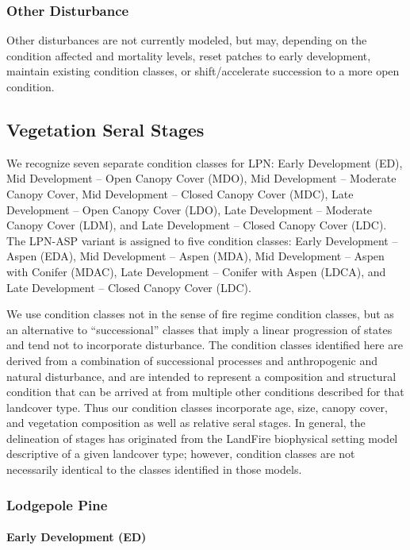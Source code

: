 \subsubsection{Other Disturbance}
Other disturbances are not currently modeled, but may, depending on the condition affected and mortality levels, reset patches to early development, maintain existing condition classes, or shift/accelerate succession to a more open condition. 

\subsection*{Vegetation Seral Stages}
We recognize seven separate condition classes for LPN: Early Development (ED), Mid Development – Open Canopy Cover (MDO), Mid Development – Moderate Canopy Cover, Mid Development – Closed Canopy Cover (MDC), Late Development – Open Canopy Cover (LDO), Late Development – Moderate Canopy Cover (LDM), and Late Development – Closed Canopy Cover (LDC). The LPN-ASP variant is assigned to five condition classes: Early Development – Aspen (EDA), Mid Development – Aspen (MDA), Mid Development – Aspen with Conifer (MDAC), Late Development – Conifer with Aspen (LDCA), and Late Development – Closed Canopy Cover (LDC).

We use condition classes not in the sense of fire regime condition classes, but as an alternative to ``successional'' classes that imply a linear progression of states and tend not to incorporate disturbance. The condition classes identified here are derived from a combination of successional processes and anthropogenic and natural disturbance, and are intended to represent a composition and structural condition that can be arrived at from multiple other conditions described for that landcover type. Thus our condition classes incorporate age, size, canopy cover, and vegetation composition as well as relative seral stages. In general, the delineation of stages has originated from the LandFire biophysical setting model descriptive of a given landcover type; however, condition classes are not necessarily identical to the classes identified in those models.


\subsubsection{Lodgepole Pine}

\paragraph{Early Development (ED)}


